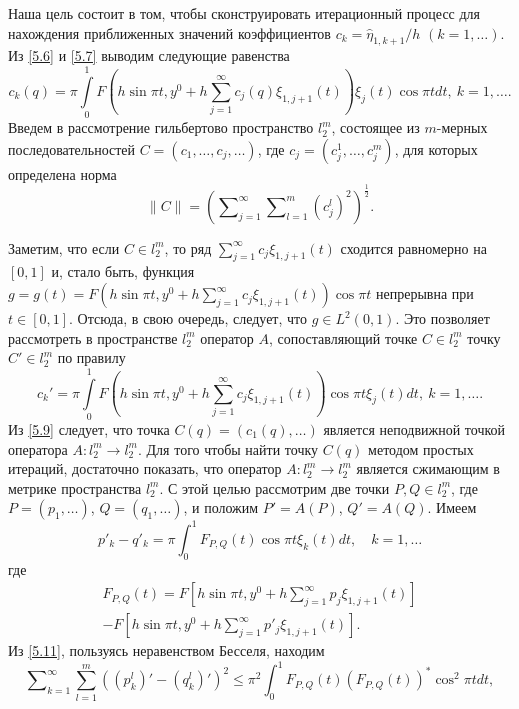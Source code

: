 \documentclass{article}
\numberwithin{equation}{section}
\theoremstyle{plain}
\theoremstyle{definition}
\begin{document}
\begin{fulltext}
Наша цель состоит в том, чтобы сконструировать итерационный процесс для нахождения приближенных значений коэффициентов $c_k=\hat \eta_{1,k+1}/h$ $(k=1,\ldots)$.
Из  \eqref{5.6} и \eqref{5.7} выводим следующие равенства
\begin{equation}\label{5.9}
c_k(q)=\pi\int\limits_{0}^1 F(h\sin\pi t,y^0+ h\sum_{j=1}^\infty c_j(q){\xi}_{1,j+1}(t))\xi_j(t)\cos\pi t dt,\ k=1,\ldots.
\end{equation}
Введем в рассмотрение гильбертово пространство $l_2^m$, состоящее из $m$-мерных последовательностей $C=(c_1,\ldots, c_j,\ldots)$, где $c_j=(c_j^1,\ldots,c_j^m)$, для которых определена норма
$$\|C\|=\left(\sum\nolimits_{j=1}^\infty \sum\nolimits_{l=1}^{m}(c_j^l)^2\right)^\frac12.$$

Заметим, что если $C\in l_2^m$, то ряд  $\sum_{j=1}^\infty c_j{\xi}_{1,j+1}(t)$ сходится равномерно на $[0,1]$ и, стало быть, функция $g=g(t)=F(h\sin\pi t,y^0+ h\sum_{j=1}^\infty c_j{\xi}_{1,j+1}(t))\cos\pi t$ непрерывна при $t\in [0,1]$. Отсюда, в свою очередь, следует, что $g\in L^2(0,1)$. Это позволяет рассмотреть в пространстве $l_2^m$  оператор $A$, сопоставляющий точке $C\in l_2^m$ точку $C'\in l_2^m$ по правилу
\begin{equation}\label{5.10}
c_k'=\pi\int\limits_{0}^1 F(h\sin\pi t,y^0+ h\sum_{j=1}^\infty c_j{\xi}_{1,j+1}(t))\cos\pi t\xi_j(t) dt,\ k=1,\ldots.
\end{equation}
Из  \eqref{5.9} следует, что точка $C(q)=(c_1(q),\ldots)$ является неподвижной точкой оператора $A:l_2^m\to l_2^m$. Для того чтобы найти точку $C(q)$ методом простых итераций, достаточно показать, что оператор $A:l_2^m\to l_2^m$ является сжимающим в метрике пространства $l_2^m$. С этой целью рассмотрим две точки $P,Q\in l_2^m$, где $P=(p_1,\ldots)$, $Q=(q_1,\ldots)$, и положим $P'=A(P)$, $Q'=A(Q)$. Имеем
\begin{equation}\label{5.11}
p'_k-q'_k=\pi\int_{0}^1 F_{P,Q}(t)\cos\pi t\xi_k(t)dt,\quad k=1,\ldots
\end{equation}
где
\begin{multline}\label{5.12}
F_{P,Q}(t)=F\left[h\sin\pi t,y^0+ h\sum\nolimits_{j=1}^\infty p_j{\xi}_{1,j+1}(t)\right] \\
  -F\left[h\sin\pi t,y^0+ h\sum\nolimits_{j=1}^\infty p'_j{\xi}_{1,j+1}(t)\right].
\end{multline}
Из \eqref{5.11}, пользуясь неравенством Бесселя, находим
 \begin{equation}\label{5.13}
\sum\nolimits_{k=1}^\infty \sum_{l=1}^m((p^l_k)'-(q^l_k)')^2\le\pi^2\int_{0}^1F_{P,Q}(t)(F_{P,Q}(t))^* \cos^2\pi tdt,

\end{equation}
\end{fulltext}
\end{document}
